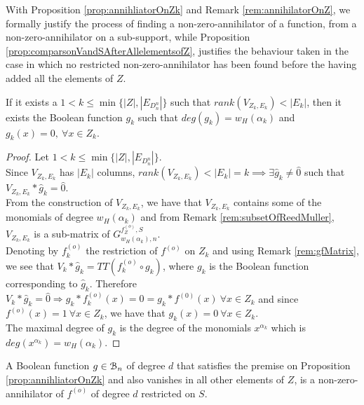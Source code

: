 \documentclass[11pt]{llncs}
\begin{document}
With Proposition \ref{prop:annihliatorOnZk} and Remark \ref{rem:annihilatorOnZ}, we formally justify the process of finding a non-zero-annihilator of a function, from a non-zero-annihilator on a sub-support, while Proposition \ref{prop:comparsonVandSAfterAllelementsofZ}, justifies the behaviour taken in the case in which no restricted non-zero-annihilator has been found before the having added all the elements of $Z$.
\begin{proposition}\label{prop:annihliatorOnZk}
    If it exists a $1 < k \leq \min\{|Z|, |E_{D_n^n}|\}$ such that $rank(V_{Z_k, E_k}) < |E_k|$, then it exists the Boolean function $g_k$ such that $deg\left(g_k\right) = w_H(\alpha_k)$ and $g_k(x) = 0,\ \forall x \in Z_k$.
\end{proposition}
\begin{proof}
    Let $1 < k \leq \min\{|Z|, |E_{D_n^n}|\}$.\\
    Since $V_{Z_k, E_k}$ has $|E_k|$ columns, $rank(V_{Z_k, E_k}) < |E_k| = k \implies \exists \hat{g}_k \neq \hat{0}$ such that $V_{Z_k, E_k}*\hat{g}_k = \hat{0}$.\\
    From the construction of $V_{Z_k, E_k}$, we have that $V_{Z_k, E_k}$ contains some of the monomials of degree $w_H\left(\alpha_{k}\right)$ and from Remark \ref{rem:subsetOfReedMuller}, $V_{Z_k, E_k}$ is a sub-matrix of $G_{w_H\left(\alpha_k\right),n}^{f_Z^{(o)}, S}$.\\
    Denoting by $f_k^{(o)}$ the restriction of $f^{(o)}$ on $Z_k$ and using Remark \ref{rem:gfMatrix}, we see that $V_k * \hat{g}_k= TT\left(f_k^{(o)}\circ g_k\right)$, where $g_k$ is the Boolean function corresponding to $\hat{g}_k$. Therefore $V_k * \hat{g}_k = \hat{0} \Rightarrow g_k * f_k^{(o)} (x) = 0 = g_k * f^{(0)} (x)\ \forall x\in Z_k$ and since $f^{(o)} (x) = 1\ \forall x\in Z_k$, we have that $g_k(x) = 0\ \forall x \in Z_k$.\\
    The maximal degree of $g_k$ is the degree of the monomials $x^{\alpha_k}$ which is $deg(x^{\alpha_k}) = w_H(\alpha_k)$.
\end{proof}

\begin{remark}\label{rem:annihilatorOnZ}
    A Boolean function $g \in \mathcal{B}_{n}$ of degree $d$ that satisfies the premise on Proposition \ref{prop:annihliatorOnZk} and also vanishes in all other elements of $Z$, is a non-zero-annihilator of $f^{(o)}$ of degree $d$ restricted on $S$.
\end{remark}
    
\end{document}
